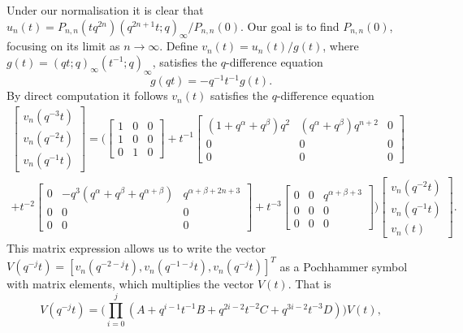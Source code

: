 \documentclass[a4paper,reqno]{amsart}
\numberwithin{equation}{section}
\numberwithin{figure}{section}
\begin{document}
Under our normalisation it is clear that $u_n(t)= P_{n,n}(tq^{2n})(q^{2n+1}t;q)_\infty/P_{n,n}(0)$. Our goal is to find $P_{n,n}(0)$, focusing on its limit as $n\to\infty$. Define $v_n(t) = u_n(t)/g(t)$, where $g(t) = (qt;q)_\infty(t^{-1};q)_\infty$, satisfies the $q$-difference equation 
 \begin{equation}\label{g diff}
  g(qt) = -q^{-1}t^{-1}g(t).
\end{equation}
 By direct computation it follows $v_n(t)$ satisfies the $q$-difference equation
\begin{multline}\label{f mat diff}
   \begin{bmatrix}
   v_n(q^{-3}t)\\
   v_n(q^{-2}t)\\
   v_n(q^{-1}t)
 \end{bmatrix}= \Bigg(\begin{bmatrix}
   1 & 0 &0\\
   1&0&0 \\
   0&1&0
   \end{bmatrix}
   +t^{-1}\begin{bmatrix}
   (1+q^\alpha+q^\beta)q^2 & (q^\alpha+q^\beta)q^{n+2} &0\\
   0&0&0 \\
   0&0&0
   \end{bmatrix}
   \\
   +t^{-2}\begin{bmatrix}
   0 & -q^3(q^\alpha+q^\beta+q^{\alpha+\beta}) &q^{\alpha+\beta+2n+3}\\
   0&0&0 \\
   0&0&0
   \end{bmatrix}
   +t^{-3}\begin{bmatrix}
   0 & 0 &q^{\alpha+\beta+3}\\
   0&0&0 \\
   0&0&0
   \end{bmatrix} \Bigg)
 \begin{bmatrix}
   v_n(q^{-2}t)\\
   v_n(q^{-1}t)\\
   v_n(t)
 \end{bmatrix}.
 \end{multline}
This matrix expression allows us to write the vector $V(q^{-j}t) = [v_n(q^{-2-j}t),v_n(q^{-1-j}t),v_n(q^{-j}t)]^{T}$ as a Pochhammer symbol with matrix elements, which multiplies the vector $V(t)$. That is 
\begin{equation}\label{matrix poch}
    V(q^{-j}t) = \Big( \prod_{i=0}^j\left(A + q^{i-1}t^{-1}B + q^{2i-2}t^{-2}C + q^{3i-2}t^{-3}D\right)\Big)V(t),  
\end{equation}
\end{document}
